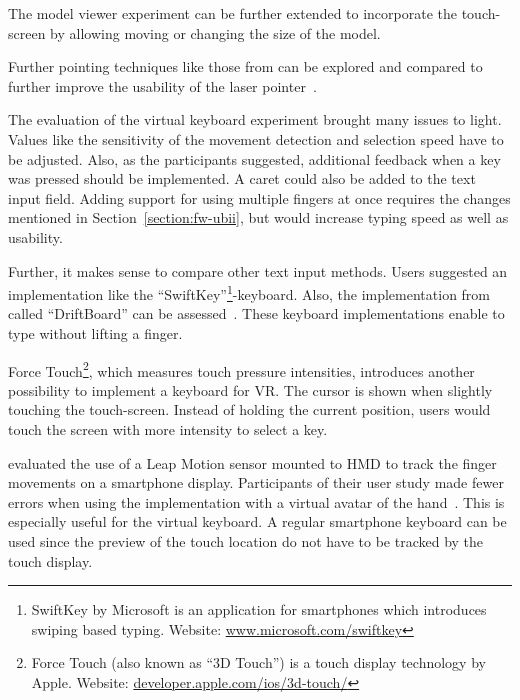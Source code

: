 The model viewer experiment can be further extended to incorporate the touch-screen by allowing moving or changing the size of the model.

Further pointing techniques like those from \citeauthor{Argelaguet.2013} can be explored and compared to further improve the usability of the laser pointer~\cite[123]{Argelaguet.2013}.

The evaluation of the virtual keyboard experiment brought many issues to light. 
Values like the sensitivity of the movement detection and selection speed have to be adjusted. Also, as the participants suggested, additional feedback when a key was pressed should be implemented. A caret could also be added to the text input field. Adding support for using multiple fingers at once requires the changes mentioned in Section~\ref{section:fw-ubii}, but would increase typing speed as well as usability.

Further, it makes sense to compare other text input methods. Users suggested an implementation like the \enquote{SwiftKey}\footnote{SwiftKey by Microsoft is an application for smartphones which introduces swiping based typing. Website: \href{https://www.microsoft.com/swiftkey}{www.microsoft.com/swiftkey}}-keyboard. Also, the implementation from \citeauthor{Shibata.2016} called \enquote{DriftBoard} can be assessed~\cite{Shibata.2016}. These keyboard implementations enable to type without lifting a finger. 

Force Touch\footnote{Force Touch (also known as \enquote{3D Touch}) is a touch display technology by Apple. Website: \href{https://developer.apple.com/ios/3d-touch/}{developer.apple.com/ios/3d-touch/}}, which measures touch pressure intensities, introduces another possibility to implement a keyboard for \gls{VR}. The cursor is shown when slightly touching the touch-screen. Instead of holding the current position, users would touch the screen with more intensity to select a key. 

\citeauthor{Afonso.2017} evaluated the use of a Leap Motion sensor mounted to \gls{HMD} to track the finger movements on a smartphone display. Participants of their user study made fewer errors when using the implementation with a virtual avatar of the hand~\cite[247\psq]{Afonso.2017}. This is especially useful for the virtual keyboard. A regular smartphone keyboard can be used since the preview of the touch location do not have to be tracked by the touch display.

